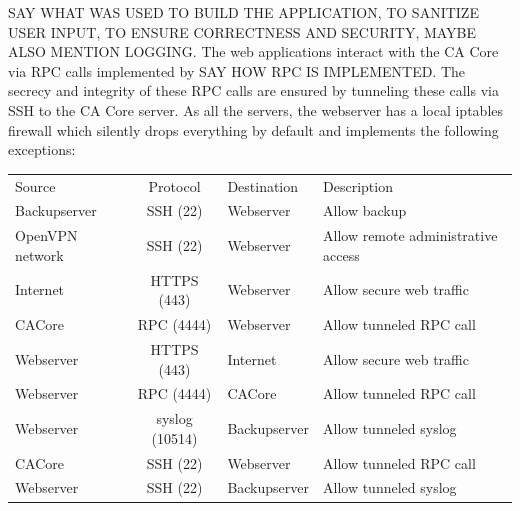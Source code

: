 \documentclass[a4paper, toc=index, 12pt, DIV14, twoside, BCOR2cm, headsepline, numbers=noenddot, bibliography=totoc]{scrbook}
\begin{document}
\begin{description}
SAY WHAT WAS USED TO BUILD THE APPLICATION, TO SANITIZE USER INPUT, TO ENSURE CORRECTNESS AND SECURITY, MAYBE ALSO MENTION LOGGING.\newline
The web applications interact with the CA Core via RPC calls implemented by SAY HOW RPC IS IMPLEMENTED. The secrecy and integrity of these RPC calls are ensured by tunneling these calls via SSH to the CA Core server.\newline
As all the servers, the webserver has a local iptables firewall which silently drops everything by default and implements the following exceptions:\newline
\begin{tabular}{p{2.5cm} c l p{4.5cm}}
Source & Protocol & Destination & Description\\
\cline{1-4}
Backupserver & SSH (22) & Webserver & Allow backup\\
\cline{1-4}
OpenVPN network & SSH (22) & Webserver & Allow remote administrative access \\
\cline{1-4}
Internet & HTTPS (443) & Webserver & Allow secure web traffic\\
\cline{1-4}
CACore & RPC (4444) & Webserver & Allow tunneled RPC call\\
\cline{1-4}
Webserver & HTTPS (443) & Internet & Allow secure web traffic\\
\cline{1-4}
Webserver & RPC (4444) &  CACore& Allow tunneled RPC call\\
\cline{1-4}
Webserver & syslog (10514) & Backupserver & Allow tunneled syslog\\
\cline{1-4}
CACore & SSH (22) & Webserver & Allow tunneled RPC call\\
\cline{1-4}
Webserver & SSH (22) & Backupserver & Allow tunneled syslog\\
\end{tabular}


\end{description}
\end{document}

